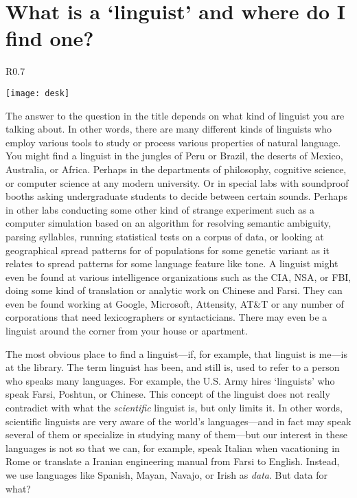 \documentclass[11pt]{book}%
\theoremstyle{plain}
\numberwithin{equation}{section}
\theoremstyle{definition}
\newtheorem{phrase string}{Phrase String}
\begin{document}
\section{What is a `linguist' and where do I find one?}\begin{wrapfigure}{R}{0.7\textwidth}
         \vspace{-1cm}
        \begin{center}
        \texttt{[image: desk]}
        \end{center}
         \vspace{-.5cm}
    \end{wrapfigure}
The answer to the question in the title depends on what kind of linguist you are talking about. In other words, there are many different kinds of linguists who employ various tools to study or process various properties of natural language. You might find a linguist in the jungles of Peru or Brazil, the deserts of Mexico, Australia, or Africa. Perhaps in the departments of philosophy, cognitive science, or computer science at any modern university. Or in special labs with soundproof booths asking undergraduate students to decide between certain sounds. Perhaps in other labs conducting some other kind of strange experiment such as a computer simulation based on an algorithm for resolving semantic ambiguity, parsing syllables, running statistical tests on a corpus of data, or looking at geographical spread patterns for of populations for some genetic variant as it relates to spread patterns for some language feature like tone. A linguist might even be found at various intelligence organizations such as the CIA, NSA, or FBI, doing some kind of translation or analytic work on Chinese and Farsi. They can even be found working at Google, Microsoft, Attensity, AT\&T or any number of corporations that need lexicographers or syntacticians. There may even be a linguist around the corner from your house or apartment. 

The most obvious place to find a linguist---if, for example, that linguist is me---is at the library. The term linguist has been, and still is, used to refer to a person who speaks many languages. For example, the U.S. Army hires `linguists' who speak Farsi, Poshtun, or Chinese. This concept of the linguist does not really contradict with what the \textsl{scientific} linguist is, but only limits it. In other words, scientific linguists are very aware of the world's languages---and in fact may speak several of them or specialize in studying many of them---but our interest in these languages is not so that we can, for example, speak Italian when vacationing in Rome or translate a Iranian engineering manual from Farsi to English. Instead, we use languages like Spanish, Mayan, Navajo, or Irish as \textsl{data}. But data for what?
\end{document}
